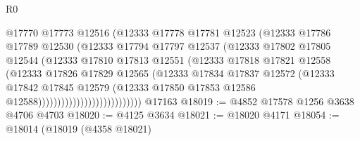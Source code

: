 \begin{lexlean}{R0}
\begin{coremodule}
                                      @17770
                                      @17773
                                      @12516
                                      (@12333
                                        @17778
                                        @17781
                                        @12523
                                        (@12333
                                          @17786
                                          @17789
                                          @12530
                                          (@12333
                                            @17794
                                            @17797
                                            @12537
                                            (@12333
                                              @17802
                                              @17805
                                              @12544
                                              (@12333
                                                @17810
                                                @17813
                                                @12551
                                                (@12333
                                                  @17818
                                                  @17821
                                                  @12558
                                                  (@12333
                                                    @17826
                                                    @17829
                                                    @12565
                                                    (@12333
                                                      @17834
                                                      @17837
                                                      @12572
                                                      (@12333
                                                        @17842
                                                        @17845
                                                        @12579
                                                        (@12333
                                                          @17850
                                                          @17853
                                                          @12586
                                                          @12588)))))))))))))))))))))))))))
    @17163
@18019 := @4852 @17578 @1256 @3638 @4706 @4703
@18020 := @4125 @3634
@18021 := @18020 @4171
@18054 := @18014
    (@18019
      (@4358 @18021)

\end{coremodule}
\end{lexlean}
